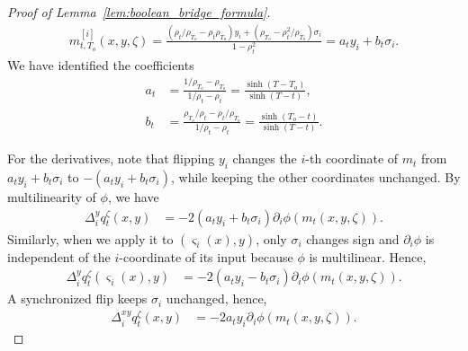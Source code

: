\documentclass[11pt]{article}
\newcommand{\flip}{\varsigma}
\newcommand{\To}{{T_o}}
\theoremstyle{named}
\theoremstyle{plain}
\begin{document}
\begin{proof}[Proof of Lemma~\ref{lem:boolean_bridge_formula}\label{proof_lem:boolean_bridge_formula}]
  \begin{align*}
      m_{t, \To}^{[i]}(x, y, \zeta) = \frac{ (\rho_t/\rho_{\To} - \rho_t \rho_\To) y_i + (\rho_\To - \rho_t^2 /\rho_\To) \sigma_i }{1-\rho_t^2} = a_{t} y_i + b_{t} \sigma_i. 
  \end{align*} 
  We have identified the coefficients
  \begin{align*}
    a_{t} &= \frac{1/\rho_{\To} - \rho_\To}{1/\rho_t-\rho_t} = \frac{\sinh(T-\To)}{\sinh(T-t)},\\
    b_{t} &= \frac{\rho_\To/\rho_t - \rho_t /\rho_\To}{1/\rho_t-\rho_t} = \frac{\sinh(\To-t)}{\sinh(T-t)}.
  \end{align*}
  
  For the derivatives, note that flipping $y_i$ changes the $i$-th coordinate of $m_t$ from $a_t y_i + b_t \sigma_i$ to $- (a_t y_i + b_t \sigma_i)$, while keeping the other coordinates unchanged. By multilinearity of $\phi$, we have
  \begin{align*}
    \Delta_i^y q_t^{\zeta}(x, y) &= - 2 (a_t y_i + b_t \sigma_i) \partial_i \phi(m_t(x, y, \zeta)).
  \end{align*}
  Similarly, when we apply it to $(\flip_i(x), y)$, only $\sigma_i$ changes sign and $\partial_i \phi$ is independent of the $i$-coordinate of its input because $\phi$ is multilinear. Hence,
  \begin{align*}
    \Delta_i^y q_t^{\zeta}(\flip_i(x), y) &= - 2 (a_t y_i - b_t \sigma_i) \partial_i \phi(m_t(x, y, \zeta)).
  \end{align*}
  A synchronized flip keeps $\sigma_i$ unchanged, hence, 
  \begin{align*}
    \Delta_i^{xy} q_t^{\zeta}(x, y) &= - 2 a_t y_i \partial_i \phi(m_t(x, y, \zeta)).
  \end{align*}
\end{proof}
\end{document}
